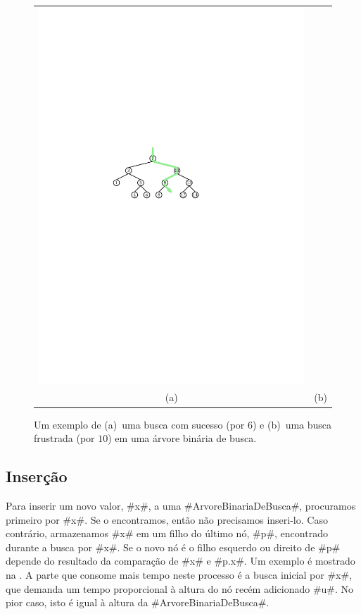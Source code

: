 \begin{figure}
\begin{center}
\begin{tabular}{cc}
    \includegraphics[width=\HalfScaleIfNeeded]{figs/bst-example-3} \\
    (a) & (b)
    \end{tabular}
  \end{center}
  \caption{Um exemplo de (a)~uma busca com sucesso (por $6$) e (b)~uma busca frustrada (por $10$) em uma árvore binária de busca.}
\end{figure}


\subsection{Inserção}

Para inserir um novo valor, #x#, a uma #ArvoreBinariaDeBusca#, procuramos primeiro por #x#. Se o encontramos, então não precisamos inseri-lo.  Caso contrário, armazenamos #x# em um filho do último nó, #p#, encontrado durante a busca por #x#. Se o novo nó é o filho esquerdo ou direito de #p# depende do resultado da comparação de #x# e #p.x#.
Um exemplo é mostrado na . A parte que consome mais tempo neste processo é a busca inicial por #x#, que demanda um tempo proporcional à altura do nó recém adicionado #u#.
No pior caso, isto é igual à altura da #ArvoreBinariaDeBusca#.


